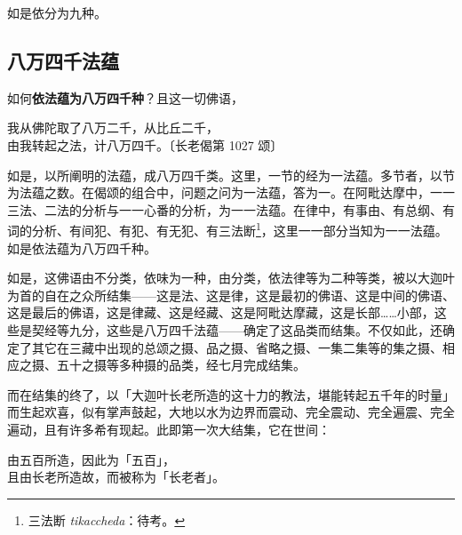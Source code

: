 如是依分为九种。

\subsection*{八万四千法蕴}

如何\textbf{依法蕴为八万四千种}？且这一切佛语，

\begin{quoting}我从佛陀取了八万二千，从比丘二千，\\由我转起之法，计八万四千。{\bluefootnotesize 〔长老偈第 1027 颂〕}\end{quoting}

如是，以所阐明的法蕴，成八万四千类。这里，一节的经为一法蕴。多节者，以节为法蕴之数。在偈颂的组合中，问题之问为一法蕴，答为一。在阿毗达摩中，一一三法、二法的分析与一一心番的分析，为一一法蕴。在律中，有事由、有总纲、有词的分析、有间犯、有犯、有无犯、有三法断\footnote{三法断 \textit{tikaccheda}：待考。}，这里一一部分当知为一一法蕴。如是依法蕴为八万四千种。

如是，这佛语由不分类，依味为一种，由分类，依法律等为二种等类，被以大迦叶为首的自在之众所结集——这是法、这是律，这是最初的佛语、这是中间的佛语、这是最后的佛语，这是律藏、这是经藏、这是阿毗达摩藏，这是长部……小部，这些是契经等九分，这些是八万四千法蕴——确定了这品类而结集。不仅如此，还确定了其它在三藏中出现的总颂之摄、品之摄、省略之摄、一集二集等的集之摄、相应之摄、五十之摄等多种摄的品类，经七月完成结集。

而在结集的终了，以「大迦叶长老所造的这十力的教法，堪能转起五千年的时量」而生起欢喜，似有掌声鼓起，大地以水为边界而震动、完全震动、完全遍震、完全遍动，且有许多希有现起。此即第一次大结集，它在世间：

\begin{quoting}由五百所造，因此为「五百」，\\且由长老所造故，而被称为「长老者」。\end{quoting}
